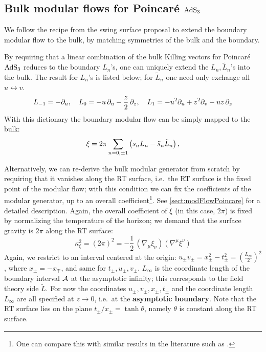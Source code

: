\documentclass[11pt,a4paper,utf8]{article}
\begin{document}
\subsection{Bulk modular flows for Poincar\'e $\mathrm{AdS}_3$}
	We follow the recipe from the swing surface proposal \cite{Apolo:2020bld,Apolo:2020qjm} to extend the boundary modular flow to the bulk, by matching symmetries of the bulk and the boundary. 
	
	By requiring that a linear combination of the bulk Killing vectors for Poincar\'e $\mathrm{AdS}_3$ reduces to the boundary $L_n$'s, one can uniquely extend the $L_n,\tilde{L}_n$'s into the bulk. The result for $L_n$'s is listed below; for $\tilde{L}_n$ one need only exchange all $u\leftrightarrow v$.
	\begin{equation}
		L_{-1} = -\partial_{u},
	\quad
		L_0 = -u\,\partial_{u} - \frac{z}{2}\,\partial_{z},
	\quad
		L_1 = -u^2\partial_{u} + z^2 \partial_{v}
			- uz\,\partial_{z}
	\end{equation}
	With this dictionary the boundary modular flow can be simply mapped to the bulk:
	\begin{equation}
		\xi = 2\pi \sum_{n=0,\pm 1} \left(
				s_n L_n - \tilde{s}_n \tilde{L}_n
			\right),
	\end{equation}
	
	Alternatively, we can re-derive the bulk modular generator from scratch by requiring that it vanishes along the RT surface, i.e.~the RT surface is the fixed point of the modular flow; with this condition we can fix the coefficients of the modular generator, up to an overall coefficient\footnote{
		One can compare this with similar results in the literature such as \cite{Lashkari:2016idm,Czech:2019vih,Apolo:2020qjm}. 
	}. See \autoref{sect:modFlowPoincare} for a detailed description. 
	Again, the overall coefficient of $\xi$ (in this case, $2\pi$) is fixed by normalizing the temperature of the horizon; we demand that the surface gravity is $2\pi$ along the RT surface:
	\begin{equation}
		\kappa_\xi^2
		= (2\pi)^2
		= -\frac{1}{2}\,
			(\nabla_{\mu} \xi_{\nu})
			(\nabla^{\mu} \xi^{\nu})
	\end{equation}
	Again, we restrict to an interval centered at the origin: $
		u_\pm v_\pm
		= x^2_\pm - t^2_\pm
		= (\frac{L_\infty}{2})^2
	$, where $x_\pm = -x_\mp$, and same for $t_\pm, u_\pm, v_\pm$. 
	$L_\infty$ is the coordinate length of the boundary interval $\mathcal{A}$ at the asymptotic infinity; this corresponds to the field theory side ${\tilde L}$. 
	For now the coordinates $u_\pm, v_\pm, x_\pm, t_\pm$ and the coordinate length $L_\infty$ are all specified at $z\to 0$, i.e.~at the \textbf{asymptotic boundary}. Note that the RT surface lies on the plane $
		t_\pm / x_\pm = \tanh \theta
	$, namely $\theta$ is constant along the RT surface. 
	
\end{document}
